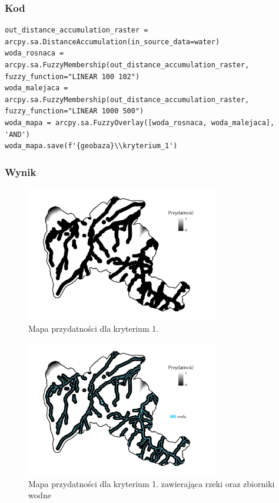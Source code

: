 \documentclass{article}
\begin{document}
\subsubsection{Kod}
\begin{lstlisting}
out_distance_accumulation_raster = arcpy.sa.DistanceAccumulation(in_source_data=water)
woda_rosnaca = arcpy.sa.FuzzyMembership(out_distance_accumulation_raster, fuzzy_function="LINEAR 100 102")
woda_malejaca = arcpy.sa.FuzzyMembership(out_distance_accumulation_raster, fuzzy_function="LINEAR 1000 500")
woda_mapa = arcpy.sa.FuzzyOverlay([woda_rosnaca, woda_malejaca], 'AND')
woda_mapa.save(f'{geobaza}\\kryterium_1')
\end{lstlisting}

\subsubsection{Wynik}
\begin{figure}[H]
    \centering
    \includegraphics[width=0.75\textwidth]{img/kryterium1-layout.jpg}
    \caption*{Mapa przydatności dla kryterium 1.}
\end{figure}

\begin{figure}[H]
    \centering
    \includegraphics[width=0.75\textwidth]{img/kryterium1-woda.jpg}
    \caption*{Mapa przydatności dla kryterium 1. zawierająca rzeki oraz zbiorniki wodne}
\end{figure}
\end{document}
